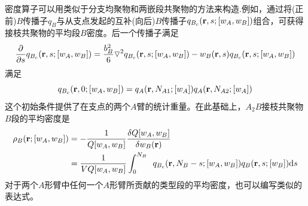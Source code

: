 密度算子可以用类似于分支均聚物和两嵌段共聚物的方法来构造.例如，通过将(正前)$B$传播子$q_B$与从支点发起的互补(向后)$B$传播子$q_{B_c}(\mathbf{r},s;[w_A,w_B])$组合，可获得接枝共聚物的平均段$B$密度。后一个传播子满足
\begin{equation}
\frac{\partial}{\partial s}q_{B_c}(\mathbf{r},s;[w_A,w_B])=\frac{b_B^2}{6}\triangledown ^2q_{B_c}(\mathbf{r},s;[w_A,w_B])-w_B(\mathbf{r},s)q_{B_c}(\mathbf{r},s;[w_A,w_B])
\end{equation}
满足
\begin{equation}
q_{B_c}(\mathbf{r},0;[w_A,w_B])=q_A(\mathbf{r},N_{A1};[w_A])q_A(\mathbf{r},N_{A2};[w_A])
\end{equation}
这个初始条件提供了在支点的两个$A$臂的统计重量。在此基础上，$A_2B$接枝共聚物$B$段的平均密度是
\begin{equation}
\begin{aligned}
\rho _B(\mathbf{r};[w_A,w_B]) & =-\frac{1}{Q[w_A,w_B]}	\frac{\delta Q[w_A,w_B]}{\delta w_B(\mathbf{r})} \\
&= \frac{1}{VQ[w_A,w_B]} \int _{0}^{N_B}\,~q_{B_c}(\mathbf{r},N_B-s;[w_A,w_B])q_B(\mathbf{r},s;[w_B])\mathrm{d}s \\
\end{aligned}	
\end{equation}
对于两个$A$形臂中任何一个$A$形臂所贡献的类型段的平均密度，也可以编写类似的表达式。
